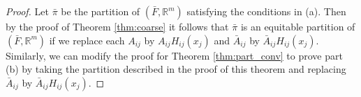 \documentclass[12pt]{thesis}
\begin{document}
\begin{proof}
Let $\bar{\pi}$ be the partition of $(\bar{F},\mathbb{R}^m)$ satisfying the conditions in (a).
Then by the proof of Theorem \ref{thm:coarse} it follows that $\bar{\pi}$ is an equitable partition of $(\bar{F},\mathbb{R}^m)$ if we replace each $A_{ij}$ by $A_{ij}H_{ij}(x_j)$ and $\bar{A}_{ij}$ by $\bar{A}_{ij}H_{ij}(x_j)$.
Similarly, we can modify the proof for Theorem \ref{thm:part_conv} to prove part (b) by taking the partition described in the proof of this theorem and replacing $\bar{A}_{ij}$ by $\bar{A}_{ij}H_{ij}(x_j)$.



\end{proof}
\end{document}

